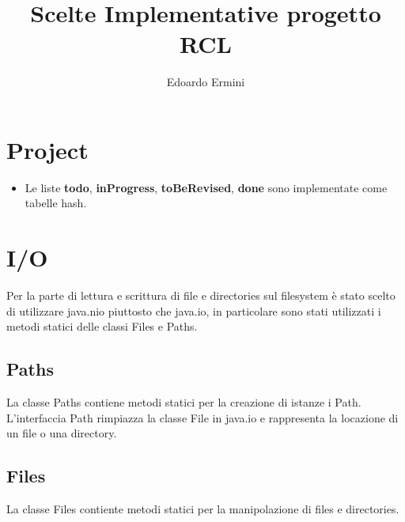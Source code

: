\documentclass[]{article}
\title{Scelte Implementative progetto RCL}
\author{Edoardo Ermini}
\begin{document}
\maketitle

\begin{abstract}

\end{abstract}

\section{Project}
\begin{itemize}
	\item Le liste \textbf{todo}, \textbf{inProgress}, \textbf{toBeRevised}, \textbf{done} sono implementate come tabelle hash.
\end{itemize}

\section{I/O}
Per la parte di lettura e scrittura di file e directories sul filesystem è stato scelto di utilizzare java.nio piuttosto che java.io, in particolare sono stati utilizzati i metodi statici delle classi Files e Paths.

\subsection{Paths}
La classe Paths contiene metodi statici per la creazione di istanze i Path.
L'interfaccia Path rimpiazza la classe File in java.io e rappresenta la locazione di un file o una directory.

\subsection{Files}
La classe Files contiente metodi statici per la manipolazione di files e directories.
\end{document}
